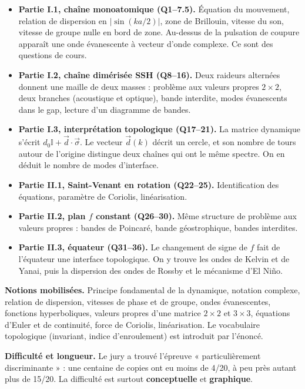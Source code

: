 \documentclass[11pt,a4paper]{article}
\providecommand{\tightlist}{\setlength{\itemsep}{0pt}\setlength{\parskip}{0pt}}
\begin{document}
\begin{itemize}
\tightlist
\item
  \textbf{Partie I.1, chaîne monoatomique (Q1--7.5).} Équation du mouvement, relation de dispersion en \(\lvert\sin(ka/2)\rvert\), zone de Brillouin, vitesse du son, vitesse de groupe nulle en bord de zone. Au-dessus de la pulsation de coupure apparaît une onde évanescente à vecteur d'onde complexe. Ce sont des questions de cours.
\item
  \textbf{Partie I.2, chaîne dimérisée SSH (Q8--16).} Deux raideurs alternées donnent une maille de deux masses : problème aux valeurs propres \(2\times2\), deux branches (acoustique et optique), bande interdite, modes évanescents dans le gap, lecture d'un diagramme de bandes.
\item
  \textbf{Partie I.3, interprétation topologique (Q17--21).} La matrice dynamique s'écrit \(d_0\mathbb I+\vec d\cdot\vec\sigma\). Le vecteur \(\vec d(k)\) décrit un cercle, et son nombre de tours autour de l'origine distingue deux chaînes qui ont le même spectre. On en déduit le nombre de modes d'interface.
\item
  \textbf{Partie II.1, Saint-Venant en rotation (Q22--25).} Identification des équations, paramètre de Coriolis, linéarisation.
\item
  \textbf{Partie II.2, plan \(f\) constant (Q26--30).} Même structure de problème aux valeurs propres : bandes de Poincaré, bande géostrophique, bandes interdites.
\item
  \textbf{Partie II.3, équateur (Q31--36).} Le changement de signe de \(f\) fait de l'équateur une interface topologique. On y trouve les ondes de Kelvin et de Yanai, puis la dispersion des ondes de Rossby et le mécanisme d'El Niño.
\end{itemize}

\textbf{Notions mobilisées.} Principe fondamental de la dynamique, notation complexe, relation de dispersion, vitesses de phase et de groupe, ondes évanescentes, fonctions hyperboliques, valeurs propres d'une matrice \(2\times2\) et \(3\times3\), équations d'Euler et de continuité, force de Coriolis, linéarisation. Le vocabulaire topologique (invariant, indice d'enroulement) est introduit par l'énoncé.

\textbf{Difficulté et longueur.} Le jury a trouvé l'épreuve « particulièrement discriminante » : une centaine de copies ont eu moins de 4/20, à peu près autant plus de 15/20. La difficulté est surtout \textbf{conceptuelle} et \textbf{graphique}.
\end{document}
